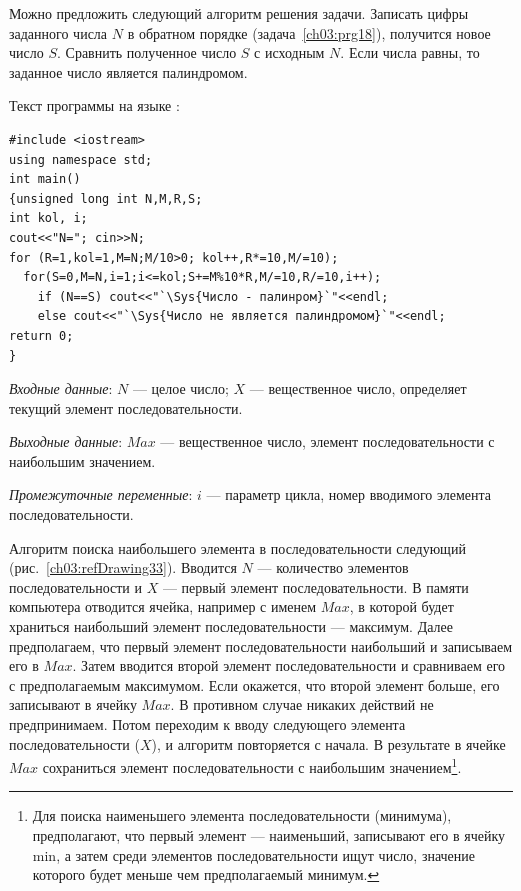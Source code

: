 Можно предложить следующий алгоритм решения задачи. Записать цифры заданного числа $N$ в обратном
порядке (задача~\ref{ch03:prg18}), получится новое число $S$.
Сравнить полученное число $S$ с исходным $N$. Если числа равны,
то заданное число является палиндромом.

Текст программы на языке :
\begin{lstlisting}
#include <iostream>
using namespace std;
int main()
{unsigned long int N,M,R,S; 
int kol, i;
cout<<"N="; cin>>N;
for (R=1,kol=1,M=N;M/10>0; kol++,R*=10,M/=10);
  for(S=0,M=N,i=1;i<=kol;S+=M%10*R,M/=10,R/=10,i++);
    if (N==S) cout<<"`\Sys{Число - палинром}`"<<endl;
    else cout<<"`\Sys{Число не является палиндромом}`"<<endl;
return 0;
}
\end{lstlisting}



\emph{Входные данные}: $N$ --- целое число; $X$ --- вещественное число,
определяет текущий элемент последовательности.

\emph{Выходные данные}: $Max$ --- вещественное число, элемент последовательности с
наибольшим значением.

\emph{Промежуточные переменные}: $i$ --- параметр цикла, номер вводимого элемента
последовательности.

Алгоритм поиска наибольшего элемента в последовательности следующий (рис.~\ref{ch03:refDrawing33}). 
Вводится $N$ --- количество элементов последовательности и $X$ --- первый элемент последовательности. 
В памяти компьютера отводится ячейка, например с
именем $Max$, в которой будет храниться наибольший элемент последовательности --- максимум. Далее
предполагаем, что первый элемент последовательности наибольший и записываем его в $Max$. Затем
вводится второй элемент последовательности и сравниваем его с предполагаемым максимумом. Если окажется, что второй
элемент больше, его записывают в ячейку $Max$. В противном случае никаких действий не предпринимаем.
Потом переходим к вводу следующего элемента последовательности ($X$), и алгоритм повторяется с начала. В результате в
ячейке $Max$ сохраниться элемент последовательности с наибольшим значением\footnote{Для поиска
наименьшего элемента последовательности (минимума), предполагают, что первый элемент --- наименьший, записывают его в
ячейку min, а затем среди элементов последовательности ищут число, значение которого будет меньше чем предполагаемый
минимум.}.


